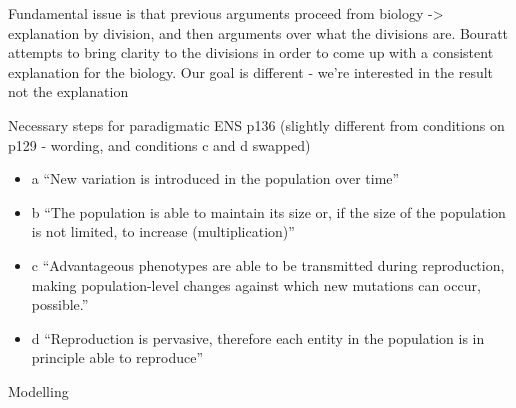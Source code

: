 Fundamental issue is that previous arguments proceed from biology
-\textgreater{} explanation by division, and then arguments over what
the divisions are. Bouratt attempts to bring clarity to the divisions
in order to come up with a consistent explanation for the biology. Our
goal is different - we're interested in the result not the explanation

Necessary steps for paradigmatic ENS p136 (slightly different from
conditions on p129 - wording, and conditions c and d swapped)
	
	
\begin{itemize}
	\item
	
	a ``New variation is introduced in the population over time''
	
	\item
	
	b ``The population is able to maintain its size or, if the size of
	the population is not limited, to increase (multiplication)''
	
	\item
	
	c ``Advantageous phenotypes are able to be transmitted during
	reproduction, making population-level changes against which new
	mutations can occur, possible.''
	
	\item
	
	d ``Reproduction is pervasive, therefore each entity in the
	population is in principle able to reproduce''
	
\end{itemize}

	
Modelling
	
